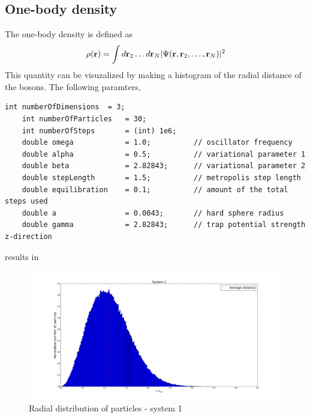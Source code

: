 \documentclass[english, a4paper]{article}
\begin{document}
\subsection{One-body density}
The one-body density is defined as
\begin{equation}
 \rho({\bf r}) = \int d{\bf r}_2 \dots d{\bf r}_N |\Psi({\bf r}, {\bf r}_2, \dots , {\bf r}_N)|^2
\end{equation}
This quantity can be visuzalized by making a histogram of the radial distance of the bosons.
The following paramters,
\belowcaptionskip=-10pt
\begin{lstlisting}[label=parameters3,caption=Parameters one-body density]
    int numberOfDimensions  = 3;
    int numberOfParticles   = 30;
    int numberOfSteps       = (int) 1e6;
    double omega            = 1.0;          // oscillator frequency
    double alpha            = 0.5;          // variational parameter 1
    double beta             = 2.82843;      // variational parameter 2
    double stepLength       = 1.5;          // metropolis step length
    double equilibration    = 0.1;          // amount of the total steps used
    double a                = 0.0043;       // hard sphere radius
    double gamma            = 2.82843;      // trap potential strength z-direction
\end{lstlisting}
results in
\begin{figure}[H]
\begin{center}
  \includegraphics[width = 200mm]{radialDistSystem1.pdf}
  \caption{Radial distribution of particles - system 1}\label{fig:density1}
  \end{center}
\end{figure}
\end{document}
